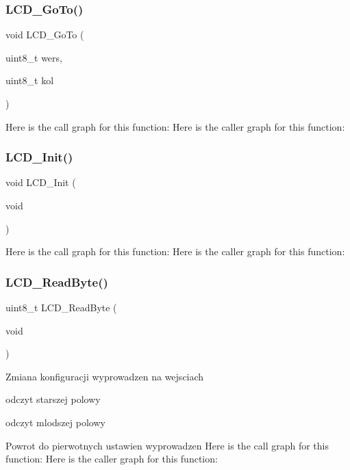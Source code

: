 \subsubsection{L\+C\+D\+\_\+\+Go\+To()}
{\footnotesize\ttfamily void L\+C\+D\+\_\+\+Go\+To (\begin{DoxyParamCaption}\item[{uint8\+\_\+t}]{wers,  }\item[{uint8\+\_\+t}]{kol }\end{DoxyParamCaption})}

Here is the call graph for this function\+:
Here is the caller graph for this function\+:
\mbox{\label{lcd4bit_8h_aa53c9d40f3aa552a9974cd55ac510cb3}} 
\subsubsection{L\+C\+D\+\_\+\+Init()}
{\footnotesize\ttfamily void L\+C\+D\+\_\+\+Init (\begin{DoxyParamCaption}\item[{void}]{ }\end{DoxyParamCaption})}

Here is the call graph for this function\+:
Here is the caller graph for this function\+:
\mbox{\label{lcd4bit_8h_ab59396403153e41cf3c098b8bff86da6}} 
\subsubsection{L\+C\+D\+\_\+\+Read\+Byte()}
{\footnotesize\ttfamily uint8\+\_\+t L\+C\+D\+\_\+\+Read\+Byte (\begin{DoxyParamCaption}\item[{void}]{ }\end{DoxyParamCaption})}

Zmiana konfiguracji wyprowadzen na wejsciach

odczyt starszej polowy

odczyt mlodszej polowy

Powrot do pierwotnych ustawien wyprowadzen Here is the call graph for this function\+:
Here is the caller graph for this function\+:
\mbox{\label{lcd4bit_8h_a17ebb04f0339e3ad2399a6b95f1409e7}} 
